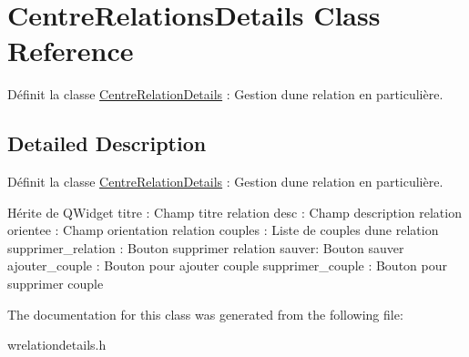 \hypertarget{class_centre_relations_details}{}\section{Centre\+Relations\+Details Class Reference}
\label{class_centre_relations_details}


Définit la classe \hyperlink{class_centre_relation_details}{Centre\+Relation\+Details} \+: Gestion d\textquotesingle{}une relation en particulière.  




\subsection{Detailed Description}
Définit la classe \hyperlink{class_centre_relation_details}{Centre\+Relation\+Details} \+: Gestion d\textquotesingle{}une relation en particulière. 

Hérite de Q\+Widget titre \+: Champ titre relation desc \+: Champ description relation orientee \+: Champ orientation relation couples \+: Liste de couples d\textquotesingle{}une relation supprimer\+\_\+relation \+: Bouton supprimer relation sauver\+: Bouton sauver ajouter\+\_\+couple \+: Bouton pour ajouter couple supprimer\+\_\+couple \+: Bouton pour supprimer couple 

The documentation for this class was generated from the following file\+:\begin{DoxyCompactItemize}
\item 
wrelationdetails.\+h\end{DoxyCompactItemize}
